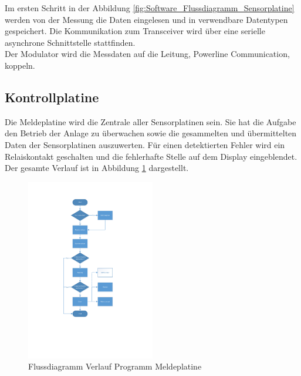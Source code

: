 Im ersten Schritt in der Abbildung \ref{fig:Software_Flussdiagramm_Sensorplatine} werden von der Messung die Daten eingelesen und in verwendbare Datentypen gespeichert. Die Kommunikation zum Transceiver wird über eine serielle asynchrone Schnittstelle stattfinden. \\Der Modulator wird die Messdaten auf die Leitung, Powerline Communication, koppeln.

\subsection{Kontrollplatine}
Die Meldeplatine wird die Zentrale aller Sensorplatinen sein. Sie hat die Aufgabe den Betrieb der Anlage zu überwachen sowie die gesammelten und übermittelten Daten der Sensorplatinen auszuwerten. Für einen detektierten Fehler wird ein Relaiskontakt geschalten und die fehlerhafte Stelle auf dem Display eingeblendet. Der gesamte Verlauf ist in Abbildung \ref{fig:Scheme_report_board} dargestellt.

\begin{figure}[h!] 
  \centering
     \includegraphics[width=0.5\textwidth]{graphics/Scheme_report_board}
  \caption{Flussdiagramm Verlauf Programm Meldeplatine}
  \label{fig:Scheme_report_board}
\end{figure}

